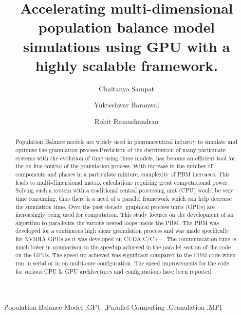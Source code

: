 \documentclass[preprint,10pt,authoryear,review]{elsarticle}
\begin{document}
\begin{frontmatter}
\title{Accelerating multi-dimensional population balance model simulations using GPU with a highly scalable framework.}


\author[label1]{Chaitanya Sampat}
\author[label1]{Yukteshwar Baranwal}
\address[label1]{Chemical and Biochemical Engineering, Rutgers University, Piscataway, NJ, USA - 08854}
\author[label1]{Rohit Ramachandran}

\begin{abstract}
Population Balance models are widely used in pharmaceutical industry to simulate
and optimize the granulation process.Prediction of the distribution of many 
particulate systems with the evolution of time using these models, has become an 
efficient tool for the on-line control of the granulation process. 
With increase in the number of components and phases in a particulate mixture, 
complexity of PBM increases. This leads to multi-dimensional matrix calculations 
requiring great computational power. Solving such a system with a traditional 
central processing unit (CPU) would be very time consuming, thus there is a 
need of a parallel framework which can help decrease the simulation time. 
Over the past decade, graphical process units (GPUs) are increasingly being 
used for computation. This study focuses on the development of an algorithm to 
parallelize the various nested loops inside the PBM. 
The PBM was developed for a continuous high shear granulation process and was made 
specifically for NVIDIA GPUs as it was developed on CUDA C/C++. The communication 
time is much lower in comparison to the speedup achieved in the parallel section 
of the code on the GPUs. The speed up achieved was significant compared to the PBM 
code when run in serial or in on multi-core configuration. The speed improvements 
for the code for various CPU \& GPU architectures and configurations have 
been reported. 
\end{abstract}

\begin{keyword}
Population Balance Model \sep GPU \sep Parallel Computing \sep Granulation \sep MPI
\end{keyword}

\end{frontmatter}
\end{document}
